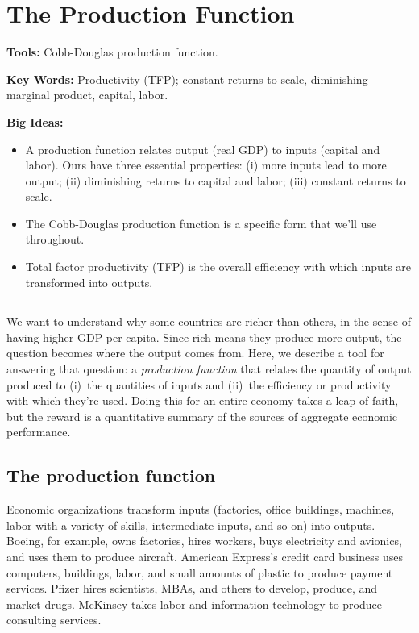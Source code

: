 \chapter{The Production Function}\label{chp:agpf}
\hypertarget{production}{}

\textbf{Tools:} Cobb-Douglas production function.

\textbf{Key Words:} Productivity (TFP); constant returns to scale, diminishing marginal product, capital, labor.

\textbf{Big Ideas:}
\vspace{-0.1in}
\begin{itemize}
\item A production function relates output (real GDP) to inputs (capital and labor).
Ours have three essential properties: (i) more inputs lead to more output;
(ii) diminishing returns to capital and labor; (iii) constant returns to scale.

\item The Cobb-Douglas production function is a specific form that we'll use throughout.
\item Total factor productivity (TFP) is the overall efficiency with which inputs are transformed into outputs.
\end{itemize}

\rule{\textwidth}{1pt}

We want to understand why some countries are richer than others,
in the sense of having higher GDP per capita.
Since rich means they produce more output,
the question becomes where the output comes from.
Here, we describe a tool for answering that question:
a {\it production function\/} that relates the quantity of output produced to
(i)~the quantities of inputs and (ii)~the efficiency or productivity
with which they're used.
Doing this for an entire economy takes a leap of faith,
but the reward is a quantitative summary of the sources of
aggregate economic performance.


\section{The production function}
\label{sec:production_function}

Economic organizations transform inputs (factories, office
buildings, machines, labor with a variety of skills, intermediate
inputs, and so on) into outputs.  Boeing, for example,
owns factories, hires workers, buys electricity and avionics, and
uses them to produce aircraft. American Express's credit card
business uses computers, buildings, labor, and small amounts of
plastic to produce payment services. Pfizer hires scientists,
MBAs, and others to develop, produce, and market drugs. McKinsey
takes labor and information technology to produce consulting
services.


